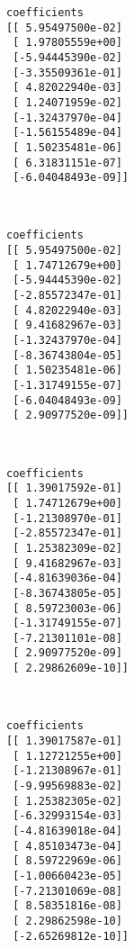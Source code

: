 \documentclass[11pt]{article}
\begin{document}
    \begin{Verbatim}[commandchars=\\\{\}]
coefficients
[[ 5.95497500e-02]
 [ 1.97805559e+00]
 [-5.94445390e-02]
 [-3.35509361e-01]
 [ 4.82022940e-03]
 [ 1.24071959e-02]
 [-1.32437970e-04]
 [-1.56155489e-04]
 [ 1.50235481e-06]
 [ 6.31831151e-07]
 [-6.04048493e-09]]

    \end{Verbatim}

    \begin{center}
    \end{center}
    { \hspace*{\fill} \\}
    
    \begin{Verbatim}[commandchars=\\\{\}]
coefficients
[[ 5.95497500e-02]
 [ 1.74712679e+00]
 [-5.94445390e-02]
 [-2.85572347e-01]
 [ 4.82022940e-03]
 [ 9.41682967e-03]
 [-1.32437970e-04]
 [-8.36743804e-05]
 [ 1.50235481e-06]
 [-1.31749155e-07]
 [-6.04048493e-09]
 [ 2.90977520e-09]]

    \end{Verbatim}

    \begin{center}
    \end{center}
    { \hspace*{\fill} \\}
    
    \begin{Verbatim}[commandchars=\\\{\}]
coefficients
[[ 1.39017592e-01]
 [ 1.74712679e+00]
 [-1.21308970e-01]
 [-2.85572347e-01]
 [ 1.25382309e-02]
 [ 9.41682967e-03]
 [-4.81639036e-04]
 [-8.36743805e-05]
 [ 8.59723003e-06]
 [-1.31749155e-07]
 [-7.21301101e-08]
 [ 2.90977520e-09]
 [ 2.29862609e-10]]

    \end{Verbatim}

    \begin{center}
    \end{center}
    { \hspace*{\fill} \\}
    
    \begin{Verbatim}[commandchars=\\\{\}]
coefficients
[[ 1.39017587e-01]
 [ 1.12721255e+00]
 [-1.21308967e-01]
 [-9.99569883e-02]
 [ 1.25382305e-02]
 [-6.32993154e-03]
 [-4.81639018e-04]
 [ 4.85103473e-04]
 [ 8.59722969e-06]
 [-1.00660423e-05]
 [-7.21301069e-08]
 [ 8.58351816e-08]
 [ 2.29862598e-10]
 [-2.65269812e-10]]

    \end{Verbatim}
\end{document}
